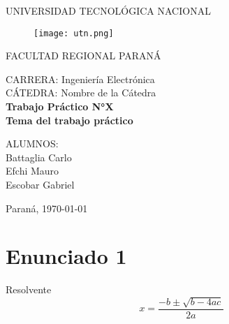 \documentclass[a4paper, 12pt]{article}
\begin{document}
\begin{titlepage}
	\begin{center}
		{\large{UNIVERSIDAD TECNOLÓGICA NACIONAL}}
	\end{center}
	\vspace{15pt}
	\begin{figure}[!ht]
		\centering
		\begin{center}
			\texttt{[image: utn.png]}
		\end{center}
	\end{figure}
	\vspace{5pt}
	\begin{center}
		{\large{FACULTAD REGIONAL PARANÁ}}
		\vspace{5pt}
		\begin{center}
			\vspace{15pt}
			\normalsize{CARRERA: Ingeniería Electrónica\\
						CÁTEDRA: Nombre de la Cátedra\\}
			\vspace{50pt}
			\huge\bfseries{Trabajo Práctico N°X\\
						Tema del trabajo práctico\\}
			\vspace{50pt}
		\end{center}
		
		\begin{flushleft}
			\begin{center}
				ALUMNOS:\\
				Battaglia Carlo\\
				Efchi Mauro\\
				Escobar Gabriel\\
			\end{center}
		\end{flushleft}
		
		\begin{center}
			\vspace{\fill}
			\normalsize{Paraná,}
			\today
		\end{center}
	\end{center}
\end{titlepage}

\newpage
{}
\tableofcontents

\newpage
{}

\section{Enunciado 1}
Resolvente
\begin{equation}
	x=\frac{-b\pm\sqrt{b-4ac}}{2a}
\end{equation}
\end{document}
